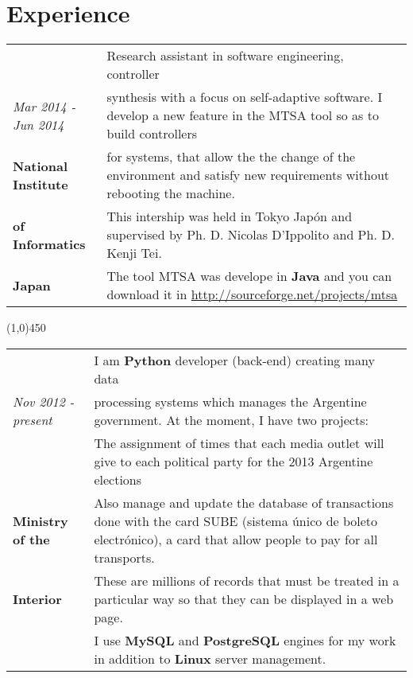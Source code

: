 \section{Experience}

\begin{tabular}{C{5cm}|p{11cm}}
& \large Research assistant in software engineering, controller  \\
\large\textit{Mar 2014 - Jun 2014} &  \large synthesis with a focus on self-adaptive software. I develop a new feature
in the MTSA tool so as to build controllers \\
\large\textbf{National Institute} & \large for systems, that allow the the change of the environment and satisfy new requirements
without rebooting the machine. \\
\large\textbf{of Informatics} & \large  This intership was held in Tokyo Japón and supervised by  
Ph. D. Nicolas D'Ippolito and Ph. D. Kenji Tei.\\
\large\textbf{Japan}  & \large The tool MTSA was develope in \textbf{Java} and you can 
download it in \url{http://sourceforge.net/projects/mtsa}\\
\end{tabular}

\begin{center}
\line(1,0){450}
\end{center}

\begin{tabular}{C{4.5cm}|p{11cm}}
& \large I am \textbf{Python} developer (back-end) creating many data \\
\large\textit{Nov 2012 - present} &  \large processing systems which manages the Argentine government. At the moment, I have two projects:\\
& \large The assignment of times that each media outlet will give to each political party for the 2013 Argentine elections\\
 \large\textbf{Ministry of the}& \large Also manage and update the database of transactions done with
the card SUBE (sistema único de boleto electrónico), a card that allow people to pay for all
transports. \\
\large\textbf{Interior}& \large These are millions of records that must be treated in a particular way so that they can
be displayed in a web page.\\
& \large I use \textbf{MySQL} and \textbf{PostgreSQL} engines for my work in addition to \textbf{Linux} server management.\\
\end{tabular}

